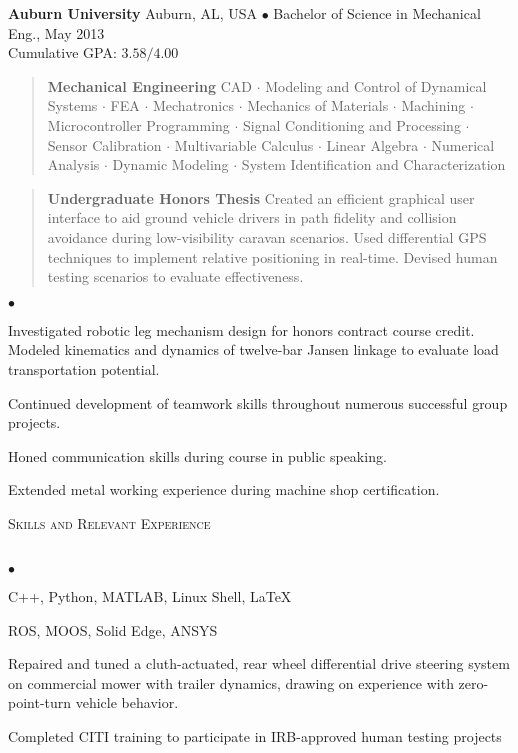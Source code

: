 \documentclass{article}
\newcommand{\area} [2] {
	\vspace*{-9pt}
	\begin{verse}
		\textbf{#1}   #2
	\end{verse} 
}
\newcommand{\lineunder} {
	\vspace*{-8pt} \\
	\hspace*{-18pt} \hrulefill \\
}
\newcommand{\header} [1] {
	{\hspace*{-15pt}\vspace*{6pt} \textsc{#1}} 
	\vspace*{-6pt} \lineunder
}
\newenvironment{achievements}{
	\begin{list}
		{$\bullet$}{\topsep 0pt \itemsep -2pt}}{\vspace*{4pt}
	\end{list}
}
\newcommand{\schoolwithcourses} [4] {
	 \textbf{#1} #2 $\bullet$ #3\\ 
	#4 \\
	\vspace*{5pt}
}
\begin{document}
	\schoolwithcourses{Auburn University}
	{Auburn, AL, USA } { Bachelor of Science in Mechanical Eng., May 2013}
	{Cumulative GPA: $3.58/4.00$}
		
		\area{Mechanical Engineering}
			{ CAD $\cdot$ Modeling and Control of Dynamical Systems $\cdot$ FEA $\cdot $ Mechatronics $\cdot$ Mechanics of Materials $\cdot$ Machining $\cdot$ Microcontroller Programming $\cdot$ Signal Conditioning and Processing $\cdot$ Sensor Calibration $\cdot$ Multivariable Calculus $\cdot$ Linear Algebra $\cdot$ Numerical Analysis $\cdot$ Dynamic Modeling $\cdot$ System Identification and Characterization}
		\area{Undergraduate Honors Thesis}
			{ Created an efficient graphical user interface to aid ground vehicle drivers in path fidelity and collision avoidance during low-visibility caravan scenarios. Used differential GPS techniques to implement relative positioning in real-time. Devised human testing scenarios to evaluate effectiveness.}
		
		\begin{achievements}
			\item Investigated robotic leg mechanism design for honors contract course credit. Modeled kinematics and dynamics of twelve-bar Jansen linkage to evaluate load transportation potential.
			\item Continued development of teamwork skills throughout numerous successful group projects.
			\item Honed communication skills during course in public speaking.
			\item Extended metal working experience during machine shop certification.
		\end{achievements}



\header{Skills and Relevant Experience}

	\begin{achievements}
		\item C++, Python, MATLAB, Linux Shell, \LaTeX
		\item ROS, MOOS,  Solid Edge, ANSYS
		\item Repaired and tuned a cluth-actuated, rear wheel differential drive steering system on commercial mower with trailer dynamics, drawing on experience with zero-point-turn vehicle behavior.
		\item Completed CITI training to participate in IRB-approved human testing projects
	\end{achievements}
\end{document}
